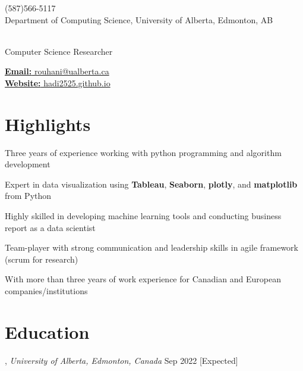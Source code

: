 \documentclass[letter,11pt]{article}
\author{{\huge (Mohammadhadi)} Hadi Rouhani} %
\makeatletter
\def\phone{(587)566-5117}
\def\city{Department of Computing Science, University of Alberta, Edmonton, AB}
\def\email{rouhani@ualberta.ca}
\def\Web{hadi2525.github.io}
\def\role{Computer Science Researcher} %
\makeatother
\begin{document}
\begin{center}
	\begin{minipage}[b]{.3\textwidth}
		\raggedright
		{\large \phone} \\ %
		{\city} %
		
	\end{minipage}%
	\begin{minipage}[b]{.4\textwidth}
		\makeatletter
		\centering {\HUGE \@author} \\
		\makeatother
		\vspace{.5em}
		{\color{highlight} \Large{\role}}
	\end{minipage}%
	\begin{minipage}[b]{.3\textwidth}
		\raggedleft 
		\href{mailto:\email}{\textbf{Email:} \email}\\ 
		\href{https://hadi2525.github.io/\Web}{\textbf{Website:} \Web}
	\end{minipage}

\end{center}
\vspace{-1em}	
\section{Highlights}
\begin{zitemize}
	\item Three years of experience working with python programming and algorithm development
	\item Expert in data visualization using \textbf{Tableau}, \textbf{Seaborn}, \textbf{plotly}, and \textbf{matplotlib} from Python
	\item Highly skilled in developing machine learning tools and conducting business report as a data scientist
	\item Team-player with strong communication and leadership skills in agile framework (scrum for research)
	\item With more than three years of work experience for Canadian and European companies/institutions
\end{zitemize}

\section{Education}
, \textit{University of Alberta, Edmonton, Canada}	\hfill  Sep 2022 [Expected]
\end{document}
